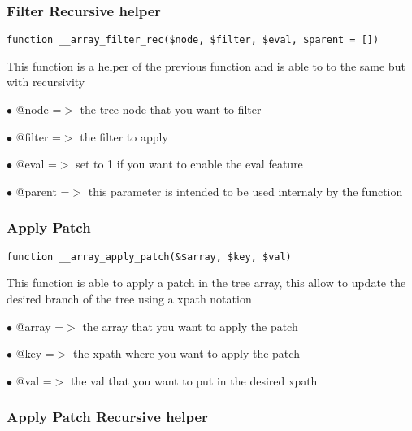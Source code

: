 \documentclass[a4paper]{article}
\begin{document}
\hypertarget{toc59}{}
\subsubsection{Filter Recursive helper}

\begin{lstlisting}
function __array_filter_rec($node, $filter, $eval, $parent = [])
\end{lstlisting}

This function is a helper of the previous function and is able to to the
same but with recursivity

\begin{compactitem}
\item[\color{myblue}$\bullet$] @node   =$>$ the tree node that you want to filter
\item[\color{myblue}$\bullet$] @filter =$>$ the filter to apply
\item[\color{myblue}$\bullet$] @eval   =$>$ set to 1 if you want to enable the eval feature
\item[\color{myblue}$\bullet$] @parent =$>$ this parameter is intended to be used internaly by the function
\end{compactitem}

\hypertarget{toc60}{}
\subsubsection{Apply Patch}

\begin{lstlisting}
function __array_apply_patch(&$array, $key, $val)
\end{lstlisting}

This function is able to apply a patch in the tree array, this allow to
update the desired branch of the tree using a xpath notation

\begin{compactitem}
\item[\color{myblue}$\bullet$] @array =$>$ the array that you want to apply the patch
\item[\color{myblue}$\bullet$] @key   =$>$ the xpath where you want to apply the patch
\item[\color{myblue}$\bullet$] @val   =$>$ the val that you want to put in the desired xpath
\end{compactitem}

\hypertarget{toc61}{}
\subsubsection{Apply Patch Recursive helper}
\end{document}
